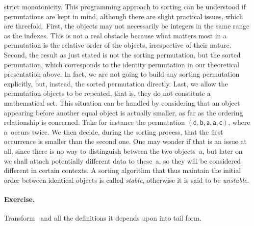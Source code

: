strict monotonicity. This programming approach to sorting can be
understood if permutations are kept in mind, although there are slight
practical issues, which are threefold. First, the objects may not
necessarily be integers in the same range as the indexes. This is not
a real obstacle because what matters most in a permutation is the
relative order of the objects, irrespective of their nature. Second,
the result as just stated is not the sorting permutation, but the
sorted permutation, which corresponds to the identity permutation in
our theoretical presentation above. In fact, we are not going to build
any sorting permutation explicitly, but, instead, the sorted
permutation directly. Last, we allow the permutation objects to be
repeated, that is, they do not constitute a mathematical set. This
situation can be handled by considering that an object appearing
before another equal object is actually smaller, as far as the
ordering relationship is concerned. Take for instance the permutation
\((\textsf{d},\textsf{b},\textsf{a},\textsf{a},\textsf{c})\), where
\textsf{a}~occurs twice. We then decide, during the sorting process,
that the first occurrence is smaller than the second one. One may
wonder if that is an issue at all, since there is no way to
distinguish between the two objects~\textsf{a}, but later on we shall
attach potentially different data to these~\textsf{a}, so they will be
considered different in certain contexts. A sorting algorithm that
thus maintain the initial order between identical objects is called
\emph{stable}, otherwise it is said to be \emph{unstable}.

\medskip

\paragraph{Exercise.}
\label{ex:permutations_and_sorting}

Transform~ and all the definitions it depends upon
into tail form.
